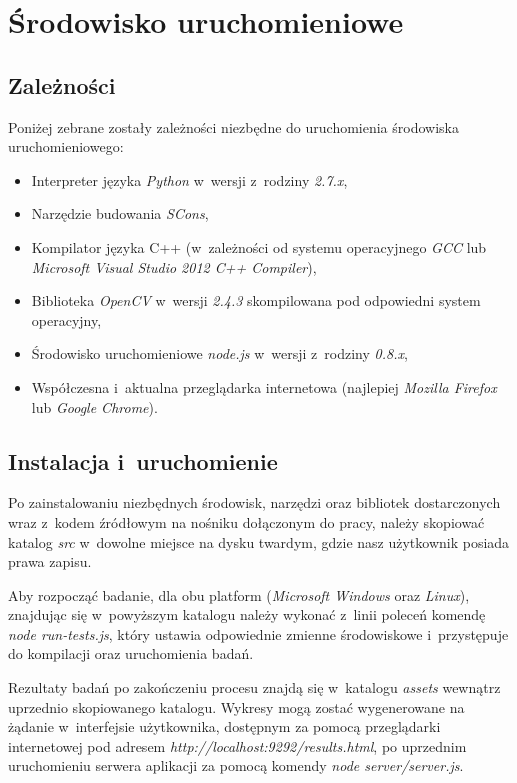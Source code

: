 \chapter{Środowisko uruchomieniowe}\label{Chapter_EnvironmentAppendix}
  \section{Zależności}\label{Section_Dependencies}

  Poniżej zebrane zostały zależności niezbędne do uruchomienia środowiska uruchomieniowego:
  \begin{itemize}
    \item Interpreter języka \textit{Python} w~wersji z~rodziny \textit{2.7.x},
    \item Narzędzie budowania \textit{SCons},
    \item Kompilator języka C++ (w~zależności od systemu operacyjnego \textit{GCC} lub \textit{Microsoft Visual Studio 2012 C++ Compiler}),
    \item Biblioteka \textit{OpenCV} w~wersji \textit{2.4.3} skompilowana pod odpowiedni system operacyjny,
    \item Środowisko uruchomieniowe \textit{node.js} w~wersji z~rodziny \textit{0.8.x},
    \item Współczesna i~aktualna przeglądarka internetowa (najlepiej \textit{Mozilla Firefox} lub \textit{Google Chrome}).
  \end{itemize}

  \section{Instalacja i~uruchomienie}\label{Section_Installation}

  Po zainstalowaniu niezbędnych środowisk, narzędzi oraz bibliotek dostarczonych wraz z~kodem źródłowym na nośniku dołączonym do pracy, należy skopiować katalog \textit{src} w~dowolne miejsce na dysku twardym, gdzie nasz użytkownik posiada prawa zapisu.

  Aby rozpocząć badanie, dla obu platform (\textit{Microsoft Windows} oraz \textit{Linux}), znajdując się w~powyższym katalogu należy wykonać z~linii poleceń komendę \textit{node run-tests.js}, który ustawia odpowiednie zmienne środowiskowe i~przystępuje do kompilacji oraz uruchomienia badań.

  Rezultaty badań po zakończeniu procesu znajdą się w~katalogu \textit{assets} wewnątrz uprzednio skopiowanego katalogu. Wykresy mogą zostać wygenerowane na żądanie w~interfejsie użytkownika, dostępnym za pomocą przeglądarki internetowej pod adresem \textit{http://localhost:9292/results.html}, po uprzednim uruchomieniu serwera aplikacji za pomocą komendy \textit{node server/server.js}.